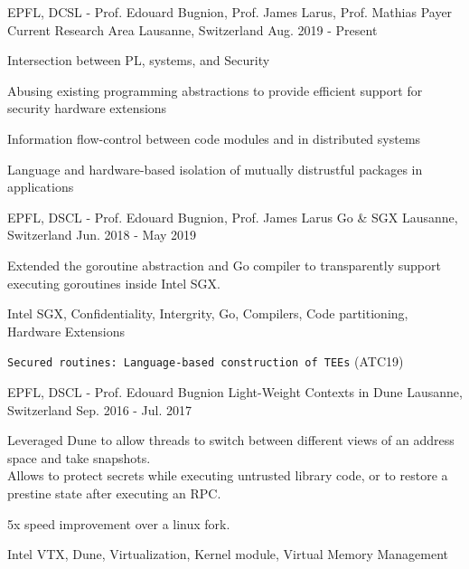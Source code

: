 


\begin{cventries}

\cventry
{EPFL, DCSL - Prof. Edouard Bugnion, Prof. James Larus, Prof. Mathias Payer}
{Current Research Area}
{Lausanne, Switzerland}
{Aug. 2019 - Present}
{ %
	\begin{cvitems}
  \item{Intersection between PL, systems, and Security}
	\item{Abusing existing programming abstractions to provide efficient support for
    security hardware extensions}
  \item{Information flow-control between code modules and in distributed systems}
  \item{Language and hardware-based isolation of mutually distrustful packages in applications}
	\end{cvitems}
}


\cventry
{EPFL, DSCL - Prof. Edouard Bugnion, Prof. James Larus}
  {Go \& SGX}
{Lausanne, Switzerland}
{Jun. 2018  - May 2019}
{
	\begin{cvitems}
	\item{Extended the goroutine abstraction and Go compiler to transparently
    support executing goroutines inside Intel SGX.}
	\item{Intel SGX, Confidentiality, Intergrity, Go, Compilers, Code partitioning, Hardware Extensions}
  \item{\texttt{Secured routines: Language-based construction of TEEs} (ATC19)}
	\end{cvitems}
}

\cventry
{EPFL, DSCL - Prof. Edouard Bugnion}
{Light-Weight Contexts in Dune}
{Lausanne, Switzerland}
{Sep. 2016 - Jul. 2017}
{
	\begin{cvitems}
  \item{Leveraged Dune to allow threads to switch between different views of
    an address space and take snapshots.\\Allows to protect secrets while executing untrusted library code, or to restore a prestine state after executing an RPC.}
  \item{5x speed improvement over a linux fork.}
	\item{Intel VTX, Dune, Virtualization, Kernel module, Virtual Memory Management}
	\end{cvitems}
}


\end{cventries}
